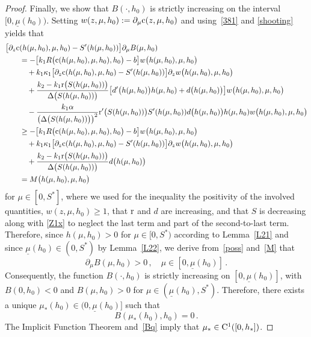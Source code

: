 \documentclass[reqno,11pt]{amsart}
\numberwithin{equation}{section}
\begin{document}
\begin{proof}
Finally, we show that $B(\cdot,h_0)$ is strictly increasing on the interval $[0,\underline\mu(h_0))$.  Setting $w(z,\mu,h_0):=\partial_\mu {\rm c}(z,\mu,h_0)$ and using~\eqref{381} and \eqref{shooting} yields that
\begin{align*}
\big[\partial_z{\rm c}&(h(\mu,h_0),\mu, h_0)-S'(h(\mu,h_0))\big] \partial_\mu B(\mu,h_0)\\
&=-\big[ k_1 R\big({\rm c}(h(\mu,h_0),\mu,h_0),h_0\big)-b\big] w\big(h(\mu, h_0),\mu,h_0\big)\\
&\quad +k_1\kappa_1 \big[\partial_z{\rm c}(h(\mu,h_0),\mu,h_0)-S'(h(\mu,h_0))\big]\partial_zw\big(h(\mu,h_0),\mu,h_0\big) \\
&\quad +\frac{k_2-k_1{\rm r}\big(S(h(\mu,h_0))\big)}{\Delta\big(S(h(\mu,h_0))\big)}\big[d'\big(h(\mu,h_0)\big)h(\mu,h_0)+d\big(h(\mu,h_0)\big)\big]w\big(h(\mu,h_0),\mu,h_0\big)\\
&\quad  -\frac{k_1\alpha}{\big(\Delta\big(S(h(\mu,h_0))\big)\big)^2} {\rm r}'\big(S(h(\mu,h_0))\big)S'(h(\mu,h_0)) d\big(h(\mu,h_0)\big)h(\mu,h_0)w\big(h(\mu, h_0),\mu, h_0\big)\\
&\ge -\big[ k_1 R\big({\rm c}(h(\mu,h_0),\mu,h_0),h_0\big)-b\big] w\big(h(\mu, h_0),\mu,h_0\big)\\
&\quad +k_1\kappa_1 \big[\partial_z{\rm c}(h(\mu,h_0),\mu,h_0)-S'(h(\mu,h_0))\big]\partial_zw\big(h(\mu,h_0),\mu,h_0\big) \\
&\quad +\frac{k_2-k_1{\rm r}\big(S(h(\mu,h_0))\big)}{\Delta\big(S(h(\mu,h_0))\big)}d\big(h(\mu,h_0)\big)\\
&= M\big(h(\mu,h_0),\mu,h_0\big)
\end{align*}
for $\mu\in [0,S^*]$, where we used for the inequality the positivity of the involved quantities, $w(z,\mu,h_0)\ge 1$, that ${\rm r}$ and $d$ are increasing, and that $S$ is decreasing along with \eqref{Z1x} to neglect the last term and part of the second-to-last term. Therefore, since $h(\mu,h_0)>0$ for $\mu\in [0,S^*)$ according to Lemma~\ref{L21} and since $\underline{\mu}(h_0)\in (0,S^*)$ by Lemma~\ref{L22}, %
we derive from~\eqref{poss} and~\eqref{M} that 
\begin{equation}\label{Bq}
\partial_\mu B(\mu,h_0)>0\,,\quad \mu\in [0,\underline{\mu}(h_0)]\,.
\end{equation}  
Consequently, the function $B(\cdot,h_0)$ is strictly increasing on $[0,\underline\mu(h_0)]$, with $B(0,h_0)<0$ and $B(\mu,h_0)>0$ for  $\mu\in (\underline\mu(h_0),S^*)$. Therefore, there exists a unique $\mu_*(h_0)\in(0,\underline\mu(h_0)]$ such that
$$
B(\mu_*(h_0),h_0)=0\,.
$$
The Implicit Function Theorem and~\eqref{Bq} imply that $\mu_*\in {\rm C}^1([0,h_*])$.
\end{proof}
\end{document}
